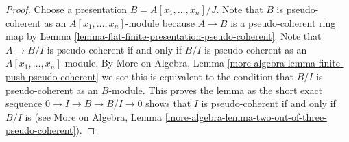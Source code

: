 \documentclass[10pt,a4paper]{amsart}
\theoremstyle{plain}
\theoremstyle{definition}
\theoremstyle{remark}
\numberwithin{equation}{subsection}
\begin{document}
\begin{proof}
Choose a presentation $B = A[x_1, \ldots, x_n]/J$.
Note that $B$ is pseudo-coherent as an $A[x_1, \ldots, x_n]$-module
because $A \to B$ is a pseudo-coherent ring map by
Lemma \ref{lemma-flat-finite-presentation-pseudo-coherent}.
Note that $A \to B/I$ is pseudo-coherent if and only if
$B/I$ is pseudo-coherent as an $A[x_1, \ldots, x_n]$-module. By
More on Algebra, Lemma \ref{more-algebra-lemma-finite-push-pseudo-coherent}
we see this is equivalent to the condition that $B/I$ is
pseudo-coherent as an $B$-module. This proves the lemma as the
short exact sequence $0 \to I \to B \to B/I \to 0$
shows that $I$ is pseudo-coherent if and only if $B/I$ is (see
More on Algebra,
Lemma \ref{more-algebra-lemma-two-out-of-three-pseudo-coherent}).
\end{proof}
\end{document}
